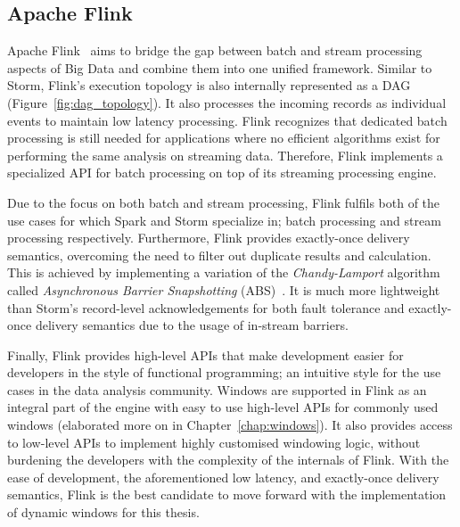 \subsection{Apache Flink}%
\label{sub:Apache Flink}

Apache Flink~\cite{flink} aims to bridge the gap between batch and stream processing aspects of 
Big Data and combine them into one unified framework. Similar to Storm, 
Flink's execution topology is also internally represented as a DAG (Figure~\ref{fig:dag_topology}).
It also processes the incoming records as 
individual events to maintain low latency processing. Flink recognizes that
dedicated batch processing is still needed for applications where no efficient algorithms 
exist for performing the same analysis on streaming data. Therefore, Flink implements a 
specialized API for batch processing on top of its streaming processing engine.

Due to the focus on both batch and stream processing, Flink fulfils both 
of the use cases for which 
Spark and Storm specialize in; batch processing and stream processing respectively. Furthermore, 
Flink provides exactly-once delivery semantics, overcoming the need to filter out duplicate 
results and calculation. This is achieved by implementing a variation of the \emph{Chandy-Lamport} algorithm
called \emph{Asynchronous Barrier Snapshotting} (ABS)~\cite{asynchronous_barrier}.
It is much more lightweight than Storm's record-level 
acknowledgements for both fault tolerance and exactly-once delivery semantics
due to the usage of in-stream barriers.  

Finally, Flink provides high-level APIs that make development easier for developers in 
the style of functional programming; an intuitive style for the use cases in the data analysis community. 
Windows are supported in Flink as an integral part of the engine with easy to use high-level APIs for 
commonly used windows (elaborated more on in Chapter~\ref{chap:windows}).  
It also provides access to low-level APIs to implement highly customised windowing logic, without burdening 
the developers with the complexity of the internals of Flink. 
With the ease of development, the aforementioned low latency, and exactly-once delivery semantics, 
Flink is the best candidate to move forward with the implementation of dynamic windows for this thesis. 
